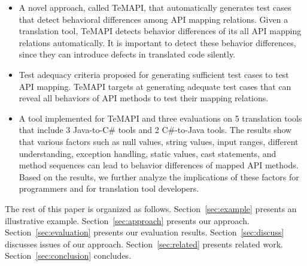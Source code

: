 \begin{itemize}\vspace*{-1.5ex}
\item A novel approach, called TeMAPI, that automatically generates test cases that detect behavioral differences among API mapping relations. Given a translation tool, TeMAPI detects behavior differences of its all API mapping relations automatically. It is important to detect these behavior differences, since they can introduce defects in translated code silently.\vspace*{-1.5ex}
\item Test adequacy criteria proposed for generating sufficient test cases to test API mapping. TeMAPI targets at generating adequate test cases that can reveal all behaviors of API methods to test their mapping relations.\vspace*{-1.5ex}
\item A tool implemented for TeMAPI and three evaluations on 5 translation tools that include 3 Java-to-C\# tools and 2 C\#-to-Java tools. The results show that various factors such as null values, string values, input ranges, different understanding, exception handling, static values, cast statements, and method sequences can lead to behavior differences of mapped API methods. Based on the results, we further analyze the implications of these factors for programmers and for translation tool developers.
\end{itemize}\vspace*{-1.5ex}

The rest of this paper is organized as follows.
Section~\ref{sec:example} presents an illustrative example.
Section~\ref{sec:approach} presents our approach.
Section~\ref{sec:evaluation} presents our evaluation results.
Section~\ref{sec:discuss} discusses issues of our approach.
Section~\ref{sec:related} presents related work.
Section~\ref{sec:conclusion} concludes.



